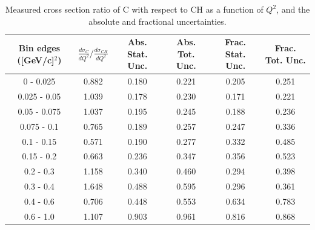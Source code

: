 \documentclass[aps,prl,twocolumn,superscriptaddress,nofootinbib]{revtex4-1}
\begin{document}
\begin{table}[h!]
  \centering
  \caption{Measured cross section ratio of C with respect to CH as a function
  of $Q^{2}$,  and the absolute and fractional uncertainties.}
    \begin{tabular}{c||c||c|c||c|c}
      Bin edges ([GeV/c]$^{2}$) & $\frac{d\sigma_{C}}{dQ^{2}}/\frac{d\sigma_{CH}}{dQ^{2}}$ & Abs. Stat. Unc. & Abs. Tot. Unc. & Frac. Stat. Unc. & Frac. Tot. Unc. \\
      \hline\hline
         0 - 0.025 & 0.882 & 0.180 & 0.221 & 0.205 & 0.251 \\
      0.025 - 0.05 & 1.039 & 0.178 & 0.230 & 0.171 & 0.221 \\
      0.05 - 0.075 & 1.037 & 0.195 & 0.245 & 0.188 & 0.236 \\
       0.075 - 0.1 & 0.765 & 0.189 & 0.257 & 0.247 & 0.336 \\
        0.1 - 0.15 & 0.571 & 0.190 & 0.277 & 0.332 & 0.485 \\
        0.15 - 0.2 & 0.663 & 0.236 & 0.347 & 0.356 & 0.523 \\
         0.2 - 0.3 & 1.158 & 0.340 & 0.460 & 0.294 & 0.398 \\
         0.3 - 0.4 & 1.648 & 0.488 & 0.595 & 0.296 & 0.361 \\
         0.4 - 0.6 & 0.706 & 0.448 & 0.553 & 0.634 & 0.783 \\
         0.6 - 1.0 & 1.107 & 0.903 & 0.961 & 0.816 & 0.868 \\
    \end{tabular}
  \label{table:Q2XSecRatio_C}
\end{table}
\end{document}

